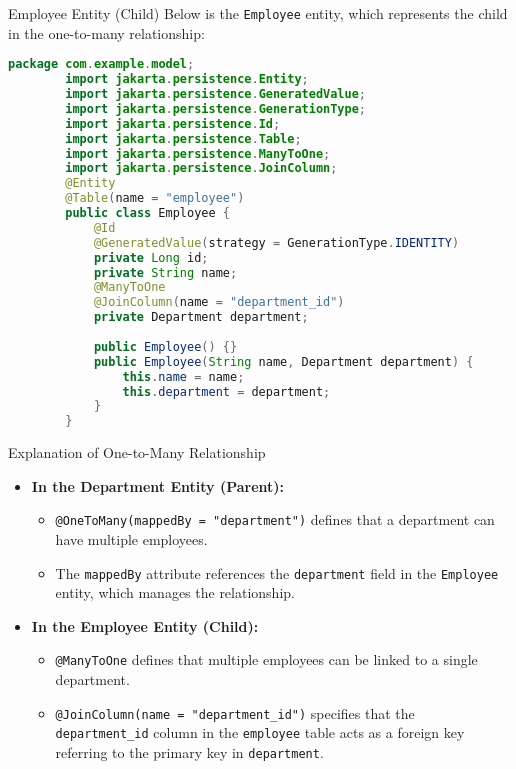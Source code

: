 \documentclass[aspectratio=169, table]{beamer}
\begin{document}
\begin{frame}[fragile]{Employee Entity (Child)}
	\vspace{30pt}
	Below is the \texttt{Employee} entity, which represents the child in the one-to-many relationship:
	
	\begin{lstlisting}[language=Java, style=JavaStyle]
		package com.example.model;
		import jakarta.persistence.Entity;
		import jakarta.persistence.GeneratedValue;
		import jakarta.persistence.GenerationType;
		import jakarta.persistence.Id;
		import jakarta.persistence.Table;
		import jakarta.persistence.ManyToOne;
		import jakarta.persistence.JoinColumn;
		@Entity
		@Table(name = "employee")
		public class Employee {
			@Id
			@GeneratedValue(strategy = GenerationType.IDENTITY)
			private Long id;
			private String name;
			@ManyToOne
			@JoinColumn(name = "department_id")
			private Department department;
			
			public Employee() {}
			public Employee(String name, Department department) {
				this.name = name;
				this.department = department;
			}
		}
	\end{lstlisting}
\end{frame}

\begin{frame}{Explanation of One-to-Many Relationship}
	\vspace{20pt}
	\begin{itemize}
		\item \textbf{In the Department Entity (Parent):}
		\begin{itemize}
			\item \texttt{@OneToMany(mappedBy = "department")} defines that a department can have multiple employees.
			\item The \texttt{mappedBy} attribute references the \texttt{department} field in the \texttt{Employee} entity, which manages the relationship.
		\end{itemize}
		\item \textbf{In the Employee Entity (Child):}
		\begin{itemize}
			\item \texttt{@ManyToOne} defines that multiple employees can be linked to a single department.
			\item \texttt{@JoinColumn(name = "department\_id")} specifies that the \texttt{department\_id} column in the \texttt{employee} table acts as a foreign key referring to the primary key in \texttt{department}.
		\end{itemize}
	\end{itemize}
\end{frame}
\end{document}
